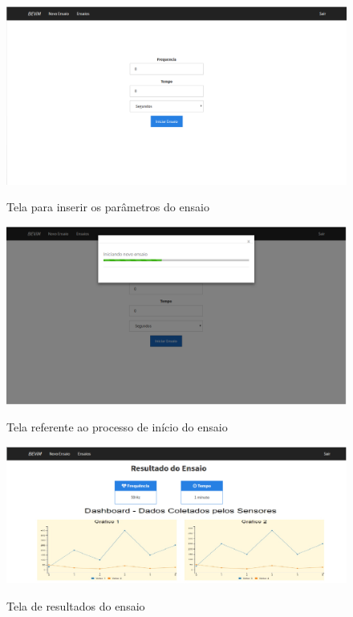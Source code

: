 \begin{figure}[!h]    
\centering
\includegraphics[keepaspectratio=true,scale=0.55]	{figuras/tela_iniciar.png}
\label{fig:tela_iniciar}	
\caption{Tela para inserir os parâmetros do ensaio}
\end{figure}  
        
\begin{figure}[!h]    
\centering
\includegraphics[keepaspectratio=true,scale=0.55]	{figuras/tela_iniciando.png}
\label{fig:tela_iniciando}
\caption{Tela referente ao processo de início do ensaio}
\end{figure}  
        
\begin{figure}[!h]    
\centering
\includegraphics[keepaspectratio=true,scale=0.52]	{figuras/tela_resultado_ensaio.png}
\label{fig:tela_resultado_ensaio}	
\caption{Tela de resultados do ensaio}
\end{figure}
        
